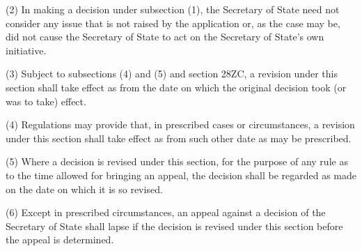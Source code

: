 \documentclass[a4paper]{article}
\begin{document}
(2)
In making a decision under subsection (1), the Secretary of State need not consider any issue that is not raised by the application or, as the case may be, did not cause the Secretary of State to act on the Secretary of State’s own initiative.

(3)
Subject to subsections (4) and (5) and section 28ZC, a revision under this section shall take effect as from the date on which the original decision took (or was to take) effect.

(4)
Regulations may provide that, in prescribed cases or circumstances, a revision under this section shall take effect as from such other date as may be prescribed.

(5)
Where a decision is revised under this section, for the purpose of any rule as to the time allowed for bringing an appeal, the decision shall be regarded as made on the date on which it is so revised.

(6)
Except in prescribed circumstances, an appeal against a decision of the Secretary of State shall lapse if the decision is revised under this section before the appeal is determined.
\end{document}
